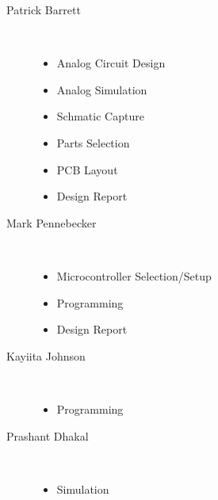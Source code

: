\documentclass[12pt]{article}
\begin{document}
\begin{singlespace}
\begin{description}
  \item[Patrick Barrett] \hfill \\
	\begin{itemize}
	  \item Analog Circuit Design
	  \item Analog Simulation
	  \item Schmatic Capture
	  \item Parts Selection
	  \item PCB Layout
	  \item Design Report
	\end{itemize}
  \item[Mark Pennebecker] \hfill \\
	\begin{itemize}
	  \item Microcontroller Selection/Setup
	  \item Programming
	  \item Design Report
	\end{itemize}

  \item[Kayiita Johnson] \hfill \\
	\begin{itemize}
	  \item Programming
	\end{itemize}

  \item[Prashant Dhakal] \hfill \\
	\begin{itemize}
	  \item Simulation
	\end{itemize}

\end{description}
\end{singlespace}
\end{document}
